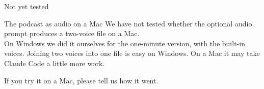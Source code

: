 \documentclass[aspectratio=169,11pt]{beamer}
\begin{document}
\begin{frame}{Not yet tested}
\begin{alertblock}{The podcast as audio on a Mac}
We have not tested whether the optional audio prompt produces a two-voice file on a Mac.\\[0.4em]
On Windows we did it ourselves for the one-minute version, with the built-in voices. Joining two voices into one file is easy on Windows. On a Mac it may take Claude Code a little more work.
\end{alertblock}
\vspace{0.6em}
\small If you try it on a Mac, please tell us how it went.
\end{frame}
\end{document}
